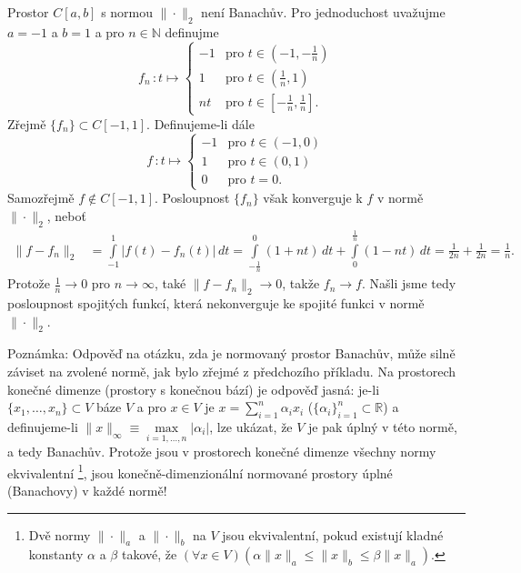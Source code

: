 \begin{ex}
   Prostor $C[a,b]$ s normou $\|\cdot\|_2$ není Banachův.
   Pro jednoduchost uvažujme $a=-1$ a $b=1$ a pro $n\in\mathbb{N}$ definujme
   \[
      f_n\,:t\mapsto\begin{cases}
          -1&\text{pro }t\in(-1,-\frac{1}{n})\\
           1&\text{pro }t\in(\frac{1}{n},1)\\
           nt&\text{pro }t\in[-\frac{1}{n},\frac{1}{n}].
           \end{cases}
   \]
   Zřejmě $\{f_n\}\subset C[-1,1]$.
   Definujeme-li dále
   \[
      f\,:t\mapsto\begin{cases}
          -1&\text{pro }t\in(-1,0)\\
           1&\text{pro }t\in(0,1)\\
           0&\text{pro }t=0.
           \end{cases}
   \]
   Samozřejmě $f\not\in C[-1,1]$.
   Posloupnost $\{f_n\}$ však konverguje k $f$ v normě $\|\cdot\|_2$, neboť
   \[
     \begin{split}
      \|f-f_n\|_2&=\int\limits_{-1}^1|f(t)-f_n(t)|\,dt
                  =\int\limits_{-\frac{1}{n}}^0 (1+nt)\,dt
                  +\int\limits_0^{\frac{1}{n}}(1-nt)\,dt
                  =\frac{1}{2n}+\frac{1}{2n}=\frac{1}{n}.
     \end{split}
   \]
   Protože $\frac{1}{n}\rightarrow 0$ pro $n\rightarrow\infty$,
   také $\|f-f_n\|_2\rightarrow 0$, takže $f_n\rightarrow f$.
   Našli jsme tedy posloupnost spojitých funkcí, která nekonverguje ke spojité funkci
   v normě $\|\cdot\|_2$.
\end{ex}

Poznámka: Odpověď na otázku, zda je normovaný prostor Banachův, 
může silně záviset na zvolené normě, jak bylo zřejmé z předchozího příkladu.
Na prostorech konečné dimenze (prostory s konečnou bází) je odpověď jasná:
je-li $\{x_1,\ldots,x_n\}\subset V$ báze $V$ a pro $x\in V$
je $x=\sum\limits_{i=1}^n\alpha_ix_i$ ($\{\alpha_i\}_{i=1}^n\subset\mathbb{R}$)
a definujeme-li $\|x\|_{\infty}\equiv\max\limits_{i=1,\ldots,n}|\alpha_i|$,
lze ukázat, že $V$ je pak úplný v této normě, a tedy Banachův.
Protože jsou v prostorech konečné dimenze všechny normy 
ekvivalentní%
\footnote{Dvě normy $\|\cdot\|_a$ a $\|\cdot\|_b$ na $V$ jsou ekvivalentní,
pokud existují kladné konstanty $\alpha$ a $\beta$ takové, že
$(\forall x\in V)(\alpha\|x\|_a\leq\|x\|_b\leq\beta\|x\|_a)$.},
jsou konečně-dimenzionální normované prostory úplné (Banachovy)
v každé normě!

